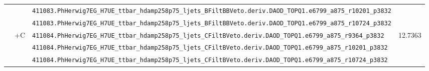 \begin{table}[htbp]
{\begin{tabular}{ll|l|r}
                                                &                               & \verb|411083.PhHerwig7EG_H7UE_ttbar_hdamp258p75_ljets_BFiltBBVeto.deriv.DAOD_TOPQ1.e6799_a875_r10201_p3832|          &  \\
                                                &                               & \verb|411083.PhHerwig7EG_H7UE_ttbar_hdamp258p75_ljets_BFiltBBVeto.deriv.DAOD_TOPQ1.e6799_a875_r10724_p3832|          &  \\ \cline{2-4}
                                                & \multirow{3}{*}{\ttbar{}+C}   & \verb|411084.PhHerwig7EG_H7UE_ttbar_hdamp258p75_ljets_CFiltBVeto.deriv.DAOD_TOPQ1.e6799_a875_r9364_p3832|            &  \multirow{3}{*}{12.7363} \\
                                                &                               & \verb|411084.PhHerwig7EG_H7UE_ttbar_hdamp258p75_ljets_CFiltBVeto.deriv.DAOD_TOPQ1.e6799_a875_r10201_p3832|           &  \\
                                                &                               & \verb|411084.PhHerwig7EG_H7UE_ttbar_hdamp258p75_ljets_CFiltBVeto.deriv.DAOD_TOPQ1.e6799_a875_r10724_p3832|           &  \\ \hline


\end{tabular}}
\end{table}
